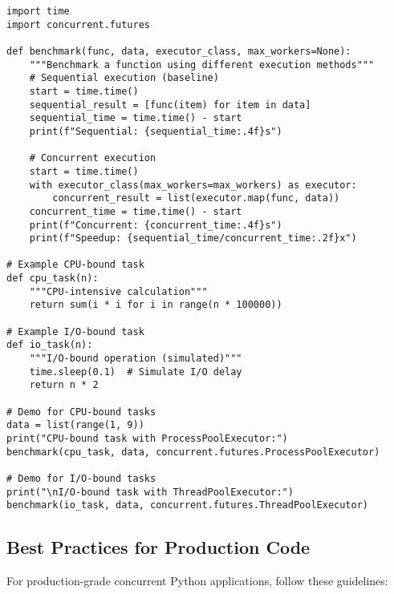 \documentclass[12pt,letterpaper]{article}
\newenvironment{macterminal}{%
    \begin{mdframed}[
        linecolor=terminalFrame,
        backgroundcolor=terminalBg,
        roundcorner=5pt,
        skipabove=10pt,
        skipbelow=10pt,
        linewidth=1pt,
        innertopmargin=10pt, %
        frametitle={%
            \tikz[baseline=(current bounding box.east), outer sep=0pt]{
                \fill[red!80!black] (0,0) circle (5pt);
                \fill[yellow!80!black] (0.7,0) circle (5pt);
                \fill[green!70!black] (1.4,0) circle (5pt);
            }
        },
        frametitlealignment=\raggedright, %
        frametitleaboveskip=8pt, %
        frametitlebelowskip=0pt, %
    ]
}{%
    \end{mdframed}%
}
\begin{document}
\begin{macterminal}
\begin{lstlisting}
import time
import concurrent.futures

def benchmark(func, data, executor_class, max_workers=None):
    """Benchmark a function using different execution methods"""
    # Sequential execution (baseline)
    start = time.time()
    sequential_result = [func(item) for item in data]
    sequential_time = time.time() - start
    print(f"Sequential: {sequential_time:.4f}s")
    
    # Concurrent execution
    start = time.time()
    with executor_class(max_workers=max_workers) as executor:
        concurrent_result = list(executor.map(func, data))
    concurrent_time = time.time() - start
    print(f"Concurrent: {concurrent_time:.4f}s")
    print(f"Speedup: {sequential_time/concurrent_time:.2f}x")

# Example CPU-bound task
def cpu_task(n):
    """CPU-intensive calculation"""
    return sum(i * i for i in range(n * 100000))

# Example I/O-bound task
def io_task(n):
    """I/O-bound operation (simulated)"""
    time.sleep(0.1)  # Simulate I/O delay
    return n * 2

# Demo for CPU-bound tasks
data = list(range(1, 9))
print("CPU-bound task with ProcessPoolExecutor:")
benchmark(cpu_task, data, concurrent.futures.ProcessPoolExecutor)

# Demo for I/O-bound tasks
print("\nI/O-bound task with ThreadPoolExecutor:")
benchmark(io_task, data, concurrent.futures.ThreadPoolExecutor)
\end{lstlisting}
\end{macterminal}

\subsection{Best Practices for Production Code}

For production-grade concurrent Python applications, follow these guidelines:
\end{document}

